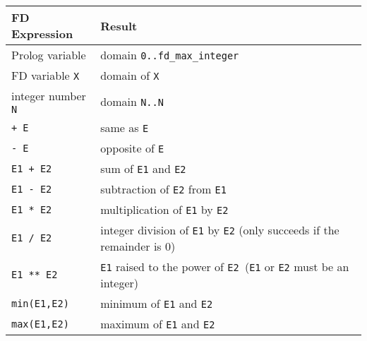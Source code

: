 \begin{tabular}{|l|L{10cm}|}
\hline

FD Expression & Result \\

\hline\hline

Prolog variable & domain \texttt{0..fd\_max\_integer} \\

\hline

FD variable \texttt{X} & domain of \texttt{X} \\

\hline

integer number \texttt{N} & domain \texttt{N..N} \\

\hline

\texttt{+ E} & same as \texttt{E} \\

\hline

\texttt{- E} & opposite of \texttt{E} \\

\hline

\texttt{E1 + E2} & sum of \texttt{E1} and \texttt{E2} \\

\hline

\texttt{E1 - E2} & subtraction of \texttt{E2} from \texttt{E1} \\

\hline

\texttt{E1 * E2} & multiplication of \texttt{E1} by \texttt{E2} \\

\hline

\texttt{E1 / E2} & integer division of \texttt{E1} by \texttt{E2} (only
succeeds if the remainder is 0) \\

\hline

\texttt{E1 ** E2} & \texttt{E1} raised to the power of \texttt{E2
}(\texttt{E1} or \texttt{E2} must be an integer) \\

\hline

\texttt{min(E1,E2)} & minimum of \texttt{E1} and \texttt{E2} \\

\hline

\texttt{max(E1,E2)} & maximum of \texttt{E1} and \texttt{E2} \\

\hline


\end{tabular}
